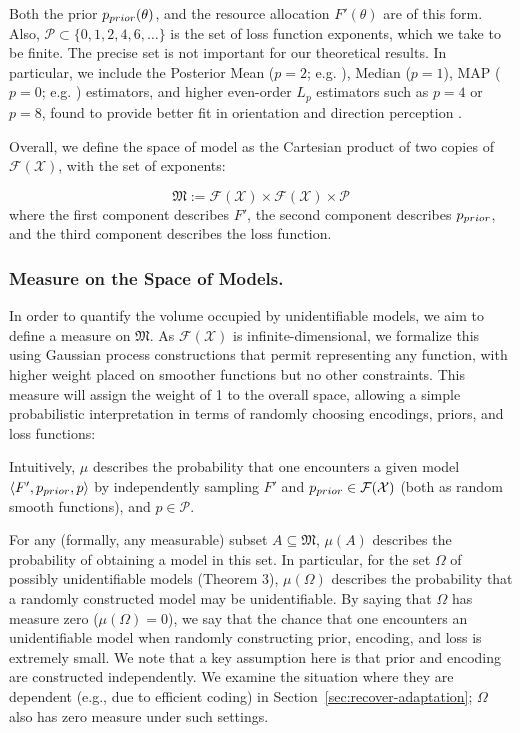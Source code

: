 Both the prior $p_{prior}(\theta)$, and the resource allocation $F'(\theta)$ are of this form. 
Also, $\mathcal{P} \subset \{0, 1, 2, 4, 6, \dots\}$ is the set of loss function exponents, which we take to be finite.
The precise set is not important for our theoretical results.
In particular, we include the Posterior Mean ($p=2$; e.g. \citep{Jazayeri2010TemporalCC}), Median ($p=1$), MAP ($p=0$; e.g. \citep{Stocker2006NoiseCA}) estimators, and higher even-order $L_p$ estimators such as $p=4$ or $p=8$, found to provide better fit in orientation and direction perception \citep{hahn2024unifying}.



Overall, we define the space of model as the Cartesian product of two copies of $\mathcal{F}(\mathcal{X})$, with the set of exponents:
\begin{defin}
\begin{equation}
    \mathfrak{M} := \mathcal{F}(\mathcal{X}) \times \mathcal{F}(\mathcal{X}) \times \mathcal{P}
\end{equation}
where the first component describes $F'$, the second component describes $p_{prior}$, and the third component describes the loss function.
\end{defin}


\subsubsection{Measure on the Space of Models.}\label{sec:measure-mu}
In order to quantify the volume occupied by unidentifiable models, we aim to define a measure on $\mathfrak{M}$. As $\mathcal{F}(\mathcal{X})$ is infinite-dimensional, we formalize this using Gaussian process constructions that permit representing any function, with higher weight placed on smoother functions but no other constraints.
This measure will assign the weight of 1 to the overall space, allowing a simple probabilistic interpretation in terms of randomly choosing encodings, priors, and loss functions:
\begin{informal_assumption}\label{ass:informal}
Intuitively, $\mu$ describes the probability that one encounters a given model $\langle F', p_{prior}, p\rangle$ by independently sampling $F'$ and $p_{prior} \in \mathcal{F}(\mathcal{X})$ (both as random smooth functions), and $p \in \mathcal{P}$.
\end{informal_assumption}
For any (formally, any measurable) subset $A \subseteq \mathfrak{M}$, $\mu(A)$ describes the probability of obtaining a model in this set. In particular, for the set $\Omega$ of possibly unidentifiable models (Theorem 3), $\mu(\Omega)$ describes the probability that a randomly constructed model may be unidentifiable.
By saying that $\Omega$ has measure zero ($\mu(\Omega) = 0$), we say that the chance that one encounters an unidentifiable model when randomly constructing prior, encoding, and loss is extremely small.
We note that a key assumption here is that prior and encoding are constructed independently.
We examine the situation where they are dependent (e.g., due to efficient coding) in Section~\ref{sec:recover-adaptation}; $\Omega$ also has zero measure under such settings.

